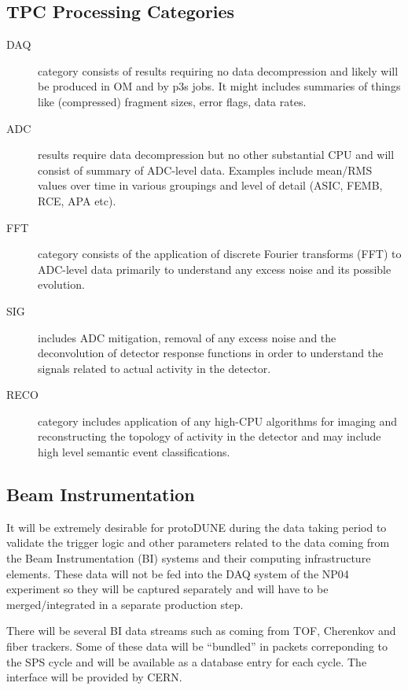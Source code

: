 \documentclass[pdftex,12pt,letter]{article}
\newcommand{\pd}{protoDUNE\xspace}
\begin{document}
\subsection{TPC Processing Categories}
\begin{description}

\item[DAQ] category consists of results requiring no data
  decompression and likely will be produced in OM and by p3s jobs.  It
  might includes summaries of things like (compressed) fragment sizes,
  error flags, data rates.

\item[ADC] results require data decompression but no other substantial
  CPU and will consist of summary of ADC-level data.  Examples include
  mean/RMS values over time in various groupings and level of detail
  (ASIC, FEMB, RCE, APA etc).

\item[FFT] category consists of the application of discrete Fourier
  transforms (FFT) to ADC-level data primarily to understand any
  excess noise and its possible evolution.

\item[SIG] includes ADC mitigation, removal of any excess noise and
  the deconvolution of detector response functions in order to
  understand the signals related to actual activity in the detector.

\item[RECO] category includes application of any high-CPU algorithms
  for imaging and reconstructing the topology of activity in the
  detector and may include high level semantic event classifications.

\end{description}

\subsection{Beam Instrumentation}
It will be extremely desirable for \pd during the data taking
period to validate the trigger logic and other
parameters related to the data coming from the Beam Instrumentation
(BI) systems and their computing infrastructure elements.
These data will not be fed into the DAQ system of the NP04
experiment so they will be captured separately and 
will have to be merged/integrated in a separate production
step.

There will be several BI data streams such as coming from TOF, Cherenkov
and fiber trackers. Some of these data will be ``bundled''  in packets
 correponding to the SPS cycle and will be available as a database
entry for each cycle. The interface will be provided
by CERN.
\end{document}
